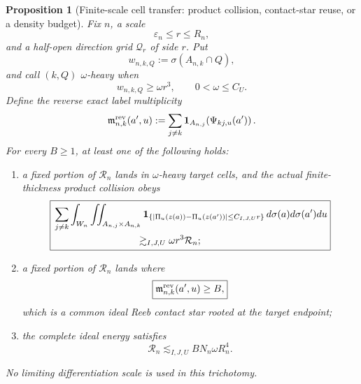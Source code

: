 \documentclass[10pt]{article}
\newtheorem{proposition}[theorem]{Proposition}
\begin{document}
\begin{proposition}[Finite-scale cell transfer: product collision, contact-star reuse, or a density budget]
\label{prop:v081-hairbrush-finite-cell-transfer}
Fix \(n\), a scale
\[
\varepsilon_n\le r\le R_n,
\]
and a half-open direction grid \(\mathcal Q_r\) of side \(r\).  Put
\[
w_{n,k,Q}:=\sigma(A_{n,k}\cap Q),
\]
and call \((k,Q)\) \(\omega\)-heavy when
\[
w_{n,k,Q}\ge\omega r^3,
\qquad 0<\omega\le C_U.
\]
Define the reverse exact label multiplicity
\begin{equation}
\label{eq:v081-hairbrush-reverse-label-multiplicity}
\mathfrak m^{\rm rev}_{n,k}(a',u)
:=
\sum_{j\ne k}
\mathbf 1_{A_{n,j}}\!\left(\Psi_{kj,u}(a')\right).
\end{equation}
For every \(B\ge1\), at least one of the following holds:
\begin{enumerate}[label=\textnormal{(\roman*)}]
\item a fixed portion of \(\mathcal R_n\) lands in \(\omega\)-heavy target cells, and the actual
finite-thickness product collision obeys
\begin{equation}
\label{eq:v081-hairbrush-heavy-cell-product-transfer}
\boxed{
\begin{aligned}
&\sum_{j\ne k}\int_{W_n}
\iint_{A_{n,j}\times A_{n,k}}
\mathbf 1_{\{|\Pi_u(z(a))-\Pi_u(z(a'))|\le C_{I,J,U}r\}}
\,d\sigma(a)d\sigma(a')du\\
&\hspace{30mm}\gtrsim_{I,J,U}
\omega r^3\mathcal R_n;
\end{aligned}
}
\end{equation}
\item a fixed portion of \(\mathcal R_n\) lands where
\begin{equation}
\label{eq:v081-hairbrush-reverse-high-reuse}
\boxed{\mathfrak m^{\rm rev}_{n,k}(a',u)\ge B,}
\end{equation}
which is a common ideal Reeb contact star rooted at the target endpoint;
\item the complete ideal energy satisfies
\begin{equation}
\label{eq:v081-hairbrush-light-cell-energy-budget}
\boxed{
\mathcal R_n
\lesssim_{I,J,U}
BN_n\omega R_n^4.
}
\end{equation}
\end{enumerate}
No limiting differentiation scale is used in this trichotomy.
\end{proposition}
\end{document}
